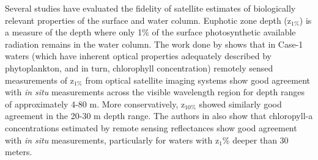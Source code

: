 \documentclass[10pt,letterpaper]{article}
\begin{document}
Several studies have evaluated the fidelity of satellite estimates of biologically relevant properties of the surface and water column. Euphotic zone depth (z$_{1\%}$) is a measure of the depth where only 1\% of the surface photosynthetic available radiation remains in the water column. The work done by \cite{lee2007euphotic} shows that in Case-1 waters (which have inherent optical properties adequately described by phytoplankton, and in turn, chlorophyll concentration) remotely sensed measurements of z$_{1\%}$ from optical satellite imaging systems show good agreement with \emph{in situ} measurements across the visible wavelength region for depth ranges of approximately 4-80 m. More conservatively, z$_{10\%}$ showed similarly good agreement in the 20-30 m depth range. The authors in \cite{lee2007euphotic} also show that chloropyll-a concentrations estimated by remote sensing reflectances show good agreement with \emph{in situ} measurements, particularly for waters with z$_1\%$ deeper than 30 meters.
\end{document}
